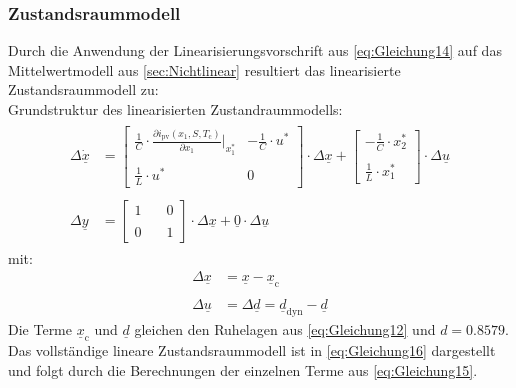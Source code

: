 \subsubsection{Zustandsraummodell}
\label{sec:Zustandsraummodell}
Durch die Anwendung der Linearisierungsvorschrift aus \autoref{eq:Gleichung14} auf das Mittelwertmodell aus \autoref{sec:Nichtlinear} resultiert das linearisierte Zustandsraummodell zu:\\
Grundstruktur des linearisierten Zustandraummodells:
\begin{align}
    \begin{split}
    \Delta\underline{\dot{x}} &= 
    \begin{bmatrix}
        \frac{1}{C}\cdot\frac{\partial i_{\mathrm{pv}}(x_{\mathrm{1}}, S, T_{\mathrm{c}})}{\partial x_{\mathrm{1}}}\big |_{x_{\mathrm{1}}^*} & -\frac{1}{C}\cdot u^* \\\\
        \frac{1}{L}\cdot u^* & 0
    \end{bmatrix} \cdot \Delta \underline{x} +
    \begin{bmatrix}
        -\frac{1}{C}\cdot x_{\mathrm{2}}^* \\\\
        \frac{1}{L}\cdot x_{\mathrm{1}}^*
    \end{bmatrix} \cdot
    \Delta \underline{u}
     \\\\
    \Delta \underline{y} &= 
    \begin{bmatrix}
        1 & \quad 0 \\\\
        0 & \quad 1
    \end{bmatrix} \cdot \Delta \underline{x} + \underline{0} \cdot \Delta\underline{u}
    \end{split}
    \label{eq:Gleichung15}
\end{align}
\newline
mit:
\begin{align*}
    \Delta \underline{x} &= \underline{x} - \underline{x}_{\mathrm{c}} \\\\
    \Delta \underline{u} &= \Delta \underline{d} = \underline{d}_{\mathrm{dyn}}-\underline{d}
\end{align*}
\newline
Die Terme $\underline{x}_{\mathrm{c}}$ und $\underline{d}$ gleichen den Ruhelagen aus \autoref{eq:Gleichung12} und $d = 0.8579$. Das vollständige lineare Zustandsraummodell ist in \autoref{eq:Gleichung16} dargestellt und folgt durch die Berechnungen der einzelnen Terme aus \autoref{eq:Gleichung15}.\\
